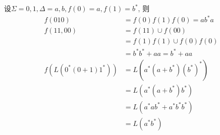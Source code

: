 \begin{example}
	设$\Sigma={0,1},\Delta={a,b},f(0)=a,f(1)=b^{\ast}$, 则
	\begin{align*}
		f(010) &= f(0)f(1)f(0)=ab^{\ast}a\\
		f({11,00})&=f(11)\cup f(00) \\
		          &=f(1)f(1)\cup f(0)f(0)\\
		          &=b^{\ast}b^{\ast}+aa = b^{\ast}+aa \\
		f(L(0^{\ast}(0+1)1^{\ast})) &= L(a^{\ast}(a+b^{\ast}){(b^{\ast})}^{\ast})\\
		&= L(a^{\ast}(a+b^{\ast})b^{\ast})\\
		&= L(a^{\ast}ab^{\ast} + a^{\ast}b^{\ast}b^{\ast})\\
		&= L(a^{\ast}b^{\ast})
	\end{align*}
\end{example}


